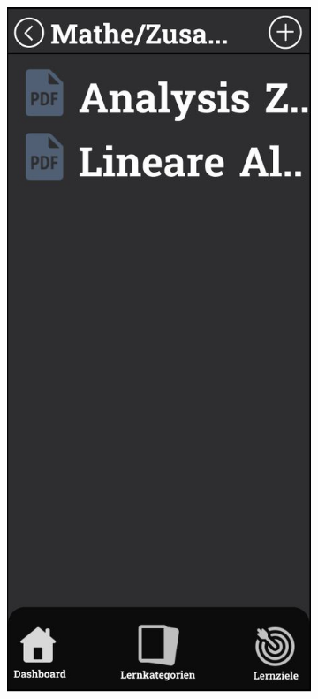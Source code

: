 \newpage

\begin{figure}[htbp]
  \centering
  \begin{subfigure}[b]{0.45\linewidth}
    \centering
    \includegraphics[width=\linewidth]{images/Mockups/Summaries.JPG}

\end{subfigure}
\end{figure}
